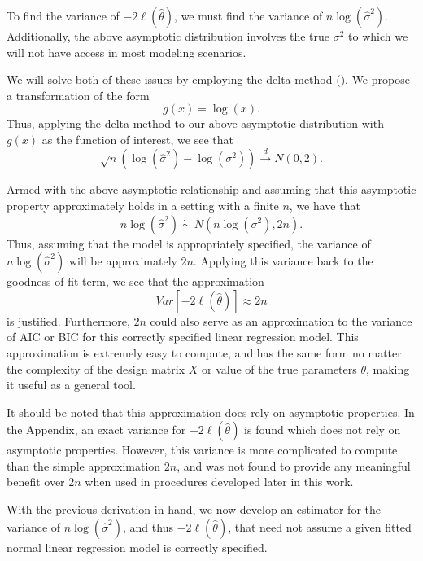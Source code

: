 \documentclass[12pt]{article} %
\theoremstyle{definition}
\begin{document}
		To find the variance of $-2 \ell (\hat{\theta}  )$, we must find the variance of $n \log(\hat{\sigma}^2)$.
		Additionally, the above asymptotic distribution involves the true $\sigma^2$ to which we will not have access in most modeling scenarios.

		We will solve both of these issues by employing the delta method (\cite{Rao}). We propose a transformation of the form
		\begin{equation*}
			g(x) = \log(x) .
		\end{equation*}
		Thus, applying the delta method to our above asymptotic distribution with $g(x)$ as the function of interest, we see that
		\begin{equation*}
			\sqrt{n} ( \log (\hat{\sigma}^2) - \log(\sigma^2)) \xrightarrow[]{d} N(0, 2) .
		\end{equation*}

		Armed with the above asymptotic relationship and assuming that this asymptotic property approximately holds in a setting with a finite $n$, we have that
		\begin{equation*}
			n\log(\hat{\sigma}^2) \; \dot\sim \; N \left( n\log(\sigma^2), 2n \right) .
		\end{equation*}
		Thus, assuming that the model is appropriately specified, the variance of $n\log(\hat{\sigma}^2)$ will be approximately $2n$. Applying this variance back to the goodness-of-fit term,
		we see that the approximation
		\begin{equation*}
			Var \left[ -2 \ell (\hat{\theta}  ) \right] \approx 2n
		\end{equation*}
		is justified. Furthermore, $2n$ could also serve as an approximation to the variance of AIC or BIC for this correctly specified linear regression model. This approximation
		is extremely easy to compute, and has the same form no matter the complexity of the design matrix $X$ or value of the true parameters $\theta$, making it useful as a
		general tool.

		It should be noted that this approximation does rely on asymptotic properties. In the Appendix, an exact variance for $-2 \ell (\hat{\theta})$ is found which does
		not rely on asymptotic properties. However, this variance is more complicated to compute than the simple approximation $2n$, and was not found to provide any meaningful
		benefit over $2n$ when used in procedures developed later in this work.

		With the previous derivation in hand, we now develop an estimator for the variance of $n\log(\hat{\sigma}^2)$, and thus $-2 \ell (\hat{\theta})$,
		that need not assume a given fitted normal linear regression model is correctly specified.
\end{document}
